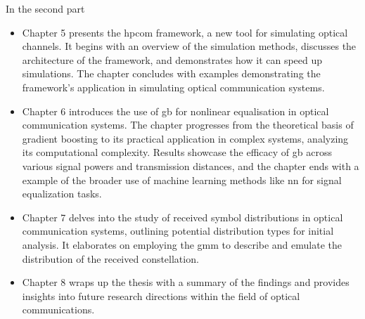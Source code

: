 In the second part
\begin{itemize}
    \item Chapter 5 presents the \acrfull{hpcom} framework, a new tool for simulating optical channels. It begins with an overview of the simulation methods, discusses the architecture of the framework, and demonstrates how it can speed up simulations. The chapter concludes with examples demonstrating the framework's application in simulating optical communication systems.
    
    \item Chapter 6 introduces the use of \acrfull{gb} for nonlinear equalisation in optical communication systems. The chapter progresses from the theoretical basis of gradient boosting to its practical application in complex systems, analyzing its computational complexity. Results showcase the efficacy of \acrshort{gb} across various signal powers and transmission distances, and the chapter ends with a example of the broader use of machine learning methods like \acrfull{nn} for signal equalization tasks.
    
    \item Chapter 7 delves into the study of received symbol distributions in optical communication systems, outlining potential distribution types for initial analysis. It elaborates on employing the \acrfull{gmm} to describe and emulate the distribution of the received constellation.
    
    \item Chapter 8 wraps up the thesis with a summary of the findings and provides insights into future research directions within the field of optical communications.
\end{itemize}
